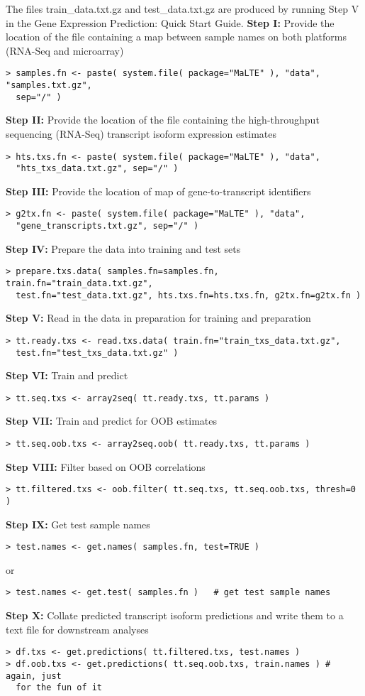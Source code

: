 \documentclass[a4paper,12pt]{article}
\begin{document}
The files train\_data.txt.gz and test\_data.txt.gz are produced by running Step V in the Gene Expression Prediction: Quick Start Guide.
\textbf{Step I:} Provide the location of the file containing a map between sample names on both platforms (RNA-Seq and microarray)
\begin{verbatim}
> samples.fn <- paste( system.file( package="MaLTE" ), "data", "samples.txt.gz", 
  sep="/" )
\end{verbatim}
\textbf{Step II:} Provide the location of the file containing the high-throughput sequencing (RNA-Seq) transcript isoform expression estimates
\begin{verbatim}
> hts.txs.fn <- paste( system.file( package="MaLTE" ), "data", 
  "hts_txs_data.txt.gz", sep="/" )
\end{verbatim}
\textbf{Step III:} Provide the location of map of gene-to-transcript identifiers
\begin{verbatim}
> g2tx.fn <- paste( system.file( package="MaLTE" ), "data", 
  "gene_transcripts.txt.gz", sep="/" )
\end{verbatim}
\textbf{Step IV:} Prepare the data into training and test sets
\begin{verbatim}
> prepare.txs.data( samples.fn=samples.fn, train.fn="train_data.txt.gz", 
  test.fn="test_data.txt.gz", hts.txs.fn=hts.txs.fn, g2tx.fn=g2tx.fn )
\end{verbatim}
\textbf{Step V:} Read in the data in preparation for training and preparation
\begin{verbatim}
> tt.ready.txs <- read.txs.data( train.fn="train_txs_data.txt.gz", 
  test.fn="test_txs_data.txt.gz" )
\end{verbatim}
\textbf{Step VI:} Train and predict
\begin{verbatim}
> tt.seq.txs <- array2seq( tt.ready.txs, tt.params )
\end{verbatim}
\textbf{Step VII:} Train and predict for OOB estimates
\begin{verbatim}
> tt.seq.oob.txs <- array2seq.oob( tt.ready.txs, tt.params )
\end{verbatim}
\textbf{Step VIII:} Filter based on OOB correlations
\begin{verbatim}
> tt.filtered.txs <- oob.filter( tt.seq.txs, tt.seq.oob.txs, thresh=0 )
\end{verbatim}
\textbf{Step IX:} Get test sample names
\begin{verbatim}
> test.names <- get.names( samples.fn, test=TRUE )
\end{verbatim}
or 
\begin{verbatim}
> test.names <- get.test( samples.fn )   # get test sample names
\end{verbatim}
\textbf{Step X:} Collate predicted transcript isoform predictions and write them to a text file for downstream analyses
\begin{verbatim}
> df.txs <- get.predictions( tt.filtered.txs, test.names )
> df.oob.txs <- get.predictions( tt.seq.oob.txs, train.names ) # again, just 
  for the fun of it
\end{verbatim}
\end{document}
